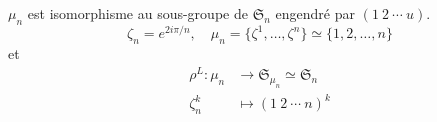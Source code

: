 \begin{example}
    \(\mu_n\) est isomorphisme au sous-groupe de \({\mathfrak{S}}_n\) engendré par \((1~2~\cdots~u)\).
    \begin{equation*}
        \zeta_n = e^{2i\pi/n}, \quad \mu_n = \{\zeta^1,\ldots,\zeta^{n}\} \simeq \{1,2,\ldots,n\}
    \end{equation*}
    et
    \begin{equation*}
        \begin{aligned}
            \rho^L : \mu_n &\to {\mathfrak{S}}_{\mu_n} \simeq {\mathfrak{S}}_{n}\\
            \zeta_n^k &\mapsto (1~2~\cdots~n)^k
        \end{aligned}
    \end{equation*}
\end{example}

